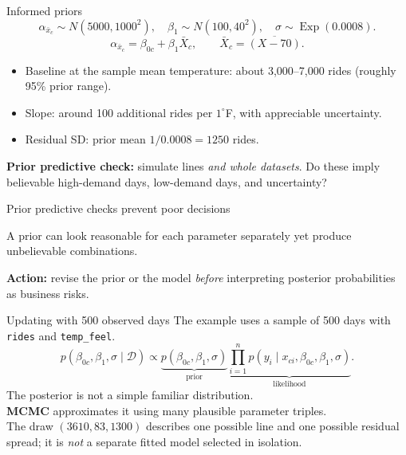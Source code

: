 \documentclass[aspectratio=43,11pt]{beamer}
\newcommand{\dd}{\mathcal D}
\begin{document}
\begin{frame}{Informed priors}
\[\alpha_{\bar x_c}\sim N(5000,1000^2),\quad \beta_1\sim N(100,40^2),\quad \sigma\sim\operatorname{Exp}(0.0008).\]
\[\alpha_{\bar x_c}=\beta_{0c}+\beta_1\bar X_c,\qquad \bar X_c=\overline{(X-70)}.\]

\begin{itemize}
\item Baseline at the sample mean temperature: about 3,000--7,000 rides (roughly 95\% prior range).
\item Slope: around 100 additional rides per $1^\circ$F, with appreciable uncertainty.
\item Residual SD: prior mean $1/0.0008=1250$ rides.
\end{itemize}

\par\medskip
\textbf{Prior predictive check:} simulate lines \emph{and whole datasets}. Do these imply believable high-demand days, low-demand days, and uncertainty?
\end{frame}

\begin{frame}{Prior predictive checks prevent poor decisions}
\begin{center}\end{center}
A prior can look reasonable for each parameter separately yet produce unbelievable combinations.
\par\medskip\textbf{Action:} revise the prior or the model \emph{before} interpreting posterior probabilities as business risks.
\end{frame}

\begin{frame}{Updating with 500 observed days}
The example uses a sample of 500 days with \texttt{rides} and \texttt{temp\_feel}.
\[p(\beta_{0c},\beta_1,\sigma\mid\dd)\propto
\underbrace{p(\beta_{0c},\beta_1,\sigma)}_{\text{prior}}
\underbrace{\prod_{i=1}^{n}p(y_i\mid x_{ci},\beta_{0c},\beta_1,\sigma)}_{\text{likelihood}}.\]
The posterior is not a simple familiar distribution.\\
\textbf{MCMC} approximates it using many plausible parameter triples.\\
The draw $(3610,83,1300)$ describes one possible line and one possible residual spread; it is \emph{not} a separate fitted model selected in isolation.
\end{frame}
\end{document}
